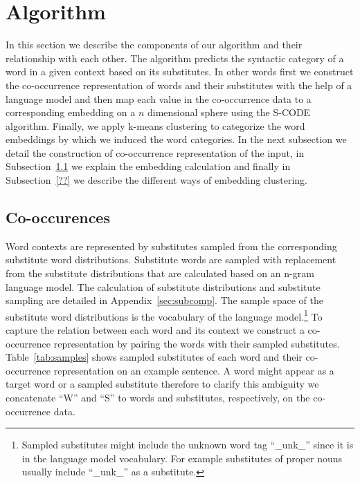 \section{Algorithm}

In this section we describe the components of our algorithm and their
relationship with each other.  The algorithm predicts the syntactic
category of a word in a given context based on its substitutes.  In
other words first we construct the co-occurrence representation of
words and their substitutes with the help of a language model and then
map each value in the co-occurrence data to a corresponding embedding
on a $n$ dimensional sphere using the S-CODE algorithm.  Finally, we
apply k-means clustering to categorize the word embeddings by which we
induced the word categories.  In the next subsection we detail the
construction of co-occurrence representation of the input, in
Subsection~\ref{sec:cooc} we explain the embedding calculation and
finally in Subsection~\ref{??} we describe the different ways of
embedding clustering.

\subsection{Co-occurences}
\label{sec:cooc}

Word contexts are represented by substitutes sampled from the
corresponding substitute word distributions.  Substitute words are
sampled with replacement from the substitute distributions that are
calculated based on an n-gram language model.  The calculation of
substitute distributions and substitute sampling are detailed in
Appendix~\ref{sec:subcomp}.  The sample space of the substitute word
distributions is the vocabulary of the language
model.\footnote{Sampled substitutes might include the unknown word tag
  ``\_unk\_'' since it is in the language model vocabulary.  For example
  substitutes of proper nouns usually include ``\_unk\_'' as a
  substitute.}  To capture the relation between each word and its
context we construct a co-occurrence representation by pairing the
words with their sampled substitutes.  Table~\ref{tab:samples} shows
sampled substitutes of each word and their co-occurrence
representation on an example sentence.  A word might appear as a
target word or a sampled substitute therefore to clarify this
ambiguity we concatenate ``W'' and ``S'' to words and substitutes,
respectively, on the co-occurrence data.

